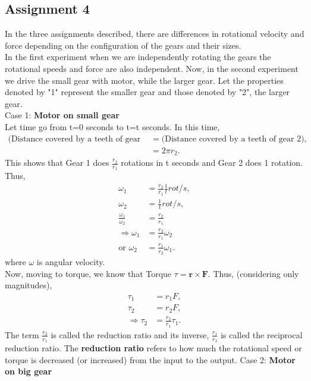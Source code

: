 \documentclass[12pt,a4paper]{report}
\begin{document}
\subsection{\textbf{Assignment 4}}
In the three assignments described, there are differences in rotational velocity and force depending on the configuration 
of the gears and their sizes.\\
In the first experiment when we are independently rotating the gears the rotational speeds and force are also independent.
Now, in the second experiment we drive the small gear with motor, while the larger gear. Let the properties denoted by "1" 
represent the smaller gear and those denoted by "2", the larger gear.\\
Case 1: \textbf{Motor on small gear}\\
Let time go from t=0 seconds to t=t seconds. In this time, 
\begin{align}
    \text{(Distance covered by a teeth of gear 1)} &= \text{(Distance covered by a teeth of gear 2)}, \\
                                                       &= 2\pi r_2.
\end{align}
This shows that Gear 1 does \(\frac{r_2}{r_1}\) rotations in t seconds and Gear 2 does 1 rotation. 
Thus, 
\begin{align}
    \omega_1&=\frac{r_2}{r_1} \frac{1}{t} rot/s,\\
    \omega_2 &= \frac{1}{t} rot/s, \\
    \frac{\omega_1}{\omega_2}&=\frac{r_2}{r_1}\\
    \Rightarrow \omega_1&=\frac{r_2}{r_1} \omega_2\\
    \text{or } \omega_2 &= \frac{r_1}{r_2}\omega_1.
\end{align}
where \(\omega\) is angular velocity. \\
Now, moving to torque, we know that Torque \(\tau = \mathbf{r} \times \mathbf{F}\).
Thus, (considering only magnitudes),
\begin{align}
    \tau_1 &= r_1F,\\
    \tau_2 &= r_2F,\\
    \Rightarrow \tau_2 &= \frac{r_2}{r_1} \tau_1.
\end{align}
The term \(\frac{r_2}{r_1}\) is called the reduction ratio and its inverse, \(\frac{r_1}{r_2}\) is called the reciprocal 
reduction ratio. 
The \textbf{reduction ratio} refers to how much the rotational speed or torque is decreased (or increased) from the 
input to the output.
Case 2: \textbf{Motor on big gear}\\
\end{document}
